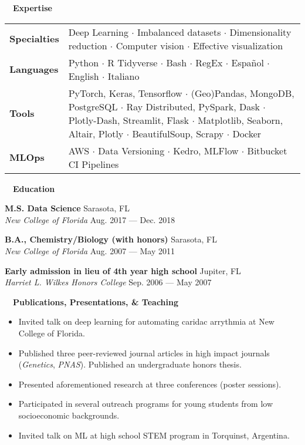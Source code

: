 \documentclass[a4paper,12pt]{article}
\newcommand{\resheading}[1]{{\hspace{-9pt} \colorbox{mygrey}{\begin{minipage}{\textwidth}{\textmd{~~\large \textbf{#1} \vphantom{p\^{E}}}}\end{minipage}}\vspace{6pt}} }
\newcommand{\ressubheading}[4]{{\begin{minipage}{\textwidth}
        \textbf{#1} \hfill #2 \\
        \textit{#3} \hfill #4 \\
        \end{minipage}}}
\begin{document}
\resheading{Expertise}

\vspace{-1em}
\begin{tabularx}{\textwidth}{p{2.5cm}>{\arraybackslash}X}
    \bfseries{Specialties} & Deep Learning $\cdot$ Imbalanced datasets $\cdot$ Dimensionality reduction  $\cdot$ Computer vision $\cdot$  Effective visualization \\
    \bfseries{Languages} & Python $\cdot$ R Tidyverse $\cdot$ Bash $\cdot$  RegEx $\cdot$ Espa\~nol $\cdot$ English $\cdot$ Italiano \\
    \bfseries{Tools} & PyTorch, Keras, Tensorflow $\cdot$ (Geo)Pandas, \mbox{MongoDB}, PostgreSQL $\cdot$ Ray Distributed, PySpark, Dask $\cdot$ Plotly-Dash, Streamlit, Flask $\cdot$ Matplotlib, Seaborn, Altair, Plotly  $\cdot$ BeautifulSoup, Scrapy $\cdot$ Docker  \\
    \bfseries{MLOps} & AWS $\cdot$ Data Versioning $\cdot$ Kedro, MLFlow $\cdot$ Bitbucket CI Pipelines  \\
\end{tabularx}


\resheading{Education}

\ressubheading{M.S. Data Science}{Sarasota, FL}{New College of Florida}{Aug. 2017 --- Dec. 2018}



\ressubheading{B.A., Chemistry/Biology (with honors)}{Sarasota, FL}{New College of Florida}{Aug. 2007 --- May 2011}

\ressubheading{Early admission in lieu of 4th year high school}{Jupiter, FL}{Harriet L. Wilkes Honors College}{Sep. 2006 --- May 2007}
\resheading{Publications, Presentations, \& Teaching}
\vspace{-19pt} \begin{itemize}
\item Invited talk on deep learning for automating caridac arrythmia at New College of Florida.
\item Published three peer-reviewed journal articles in high impact journals (\textit{Genetics}, \textit{PNAS}). Published an undergraduate honors thesis. 
\item Presented aforementioned research at three conferences (poster sessions).
\item Participated in several outreach programs for young students from low socioeconomic backgrounds. 
\item Invited talk on ML at high school STEM program in Torquinst, Argentina.
\end{itemize}
\end{document}
